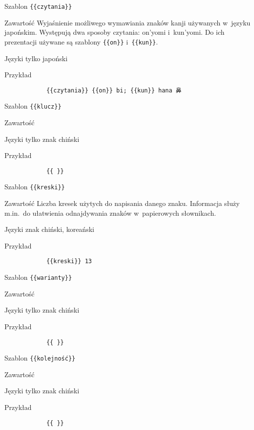 \documentclass{pracamgr}
\begin{document}
\spacer %
\begin{description-sub}
	\item[Szablon] \verb|{{czytania}}|
	\item[Zawartość] Wyjaśnienie możliwego wymawiania znaków kanji używanych w~języku japońskim. Występują dwa sposoby czytania: on'yomi i~kun'yomi. Do ich prezentacji używane są szablony \verb|{{on}}| i~\verb|{{kun}}|.
	\item[Języki] tylko japoński
	\item[Przykład]
		\begin{verbatim}
			{{czytania}} {{on}} bi; {{kun}} hana 鼻
		\end{verbatim} %
\end{description-sub}
\spacer
\begin{description-sub}
	\item[Szablon] \verb|{{klucz}}|
	\item[Zawartość]
	\item[Języki] tylko znak chiński
	\item[Przykład]
		\begin{verbatim}
			{{ }}
		\end{verbatim}
\end{description-sub}
\spacer
\begin{description-sub}
	\item[Szablon] \verb|{{kreski}}|
	\item[Zawartość] Liczba kresek użytych do napisania danego znaku. Informacja służy m.in.\ do ułatwienia odnajdywania znaków w~papierowych słownikach.
	\item[Języki] znak chiński, koreański
	\item[Przykład]
		\begin{verbatim}
			{{kreski}} 13
		\end{verbatim}
\end{description-sub}
\spacer
\begin{description-sub}
	\item[Szablon] \verb|{{warianty}}|
	\item[Zawartość]
	\item[Języki] tylko znak chiński
	\item[Przykład]
		\begin{verbatim}
			{{ }}
		\end{verbatim}
\end{description-sub}
\spacer
\begin{description-sub}
	\item[Szablon] \verb|{{kolejność}}|
	\item[Zawartość]
	\item[Języki] tylko znak chiński
	\item[Przykład]
		\begin{verbatim}
			{{ }}
		\end{verbatim}
\end{description-sub}
\end{document}
